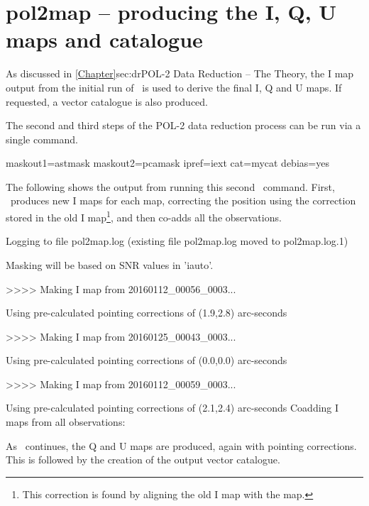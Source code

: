 \section{pol2map -- producing the I, Q, U maps and catalogue}
\label{sec:how-step23}

As discussed in \cref{Chapter}{sec:dr}{POL-2 Data Reduction -- The
  Theory}, the I map output from the initial run of \poltwomap\ is used to
derive the final I, Q and U maps. If requested, a vector catalogue is
also produced.

The second and third steps of the POL-2 data reduction process can be
run via a single command.

\begin{terminalv}
          maskout1=astmask maskout2=pcamask ipref=iext cat=mycat debias=yes
\end{terminalv}

The following shows the output from running this second \poltwomap\
command. First, \poltwomap\ produces new I maps for each map, correcting
the position using the correction stored in the old I
map\footnote{This correction is found by aligning the old I map with the
\file{iauto.sdf} map.}, and then co-adds all the observations.

\begin{terminalv}
Logging to file pol2map.log
(existing file pol2map.log moved to pol2map.log.1)

Masking will be based on SNR values in 'iauto'.

>>>>   Making I map from 20160112_00056_0003...

   Using pre-calculated pointing corrections of (1.9,2.8) arc-seconds

>>>>   Making I map from 20160125_00043_0003...

   Using pre-calculated pointing corrections of (0.0,0.0) arc-seconds

>>>>   Making I map from 20160112_00059_0003...

   Using pre-calculated pointing corrections of (2.1,2.4) arc-seconds
Coadding I maps from all observations:
\end{terminalv}

As \poltwomap\ continues, the Q and U maps are produced, again with
pointing corrections. This is followed by the creation of the output
vector catalogue.

